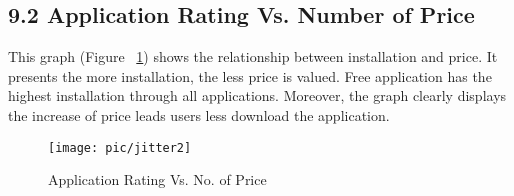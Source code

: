 \subsection*{9.2 Application Rating Vs. Number of Price}
This graph (Figure ~\ref{fig:11}) shows the relationship between installation and price. It presents the more installation, the less price is valued. Free application has the highest installation through all applications. Moreover, the graph clearly displays the increase of price leads users less download the application.
\begin{figure}
\centering
\texttt{[image: pic/jitter2]}
\caption{Application Rating Vs. No. of Price} 
\label{fig:11}
\end{figure}



